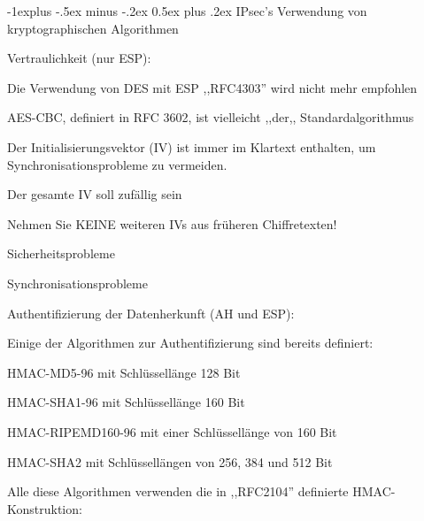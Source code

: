 \documentclass[a4paper]{article}
\makeatletter
\renewcommand{\subsection}{\@startsection{subsection}{2}{0mm}%
 {-1explus -.5ex minus -.2ex}%
 {0.5ex plus .2ex}%
 {\normalfont\normalsize\bfseries}}
\makeatother
\begin{document}
\begin{multicols}{3}
      \subsection{IPsec's Verwendung von kryptographischen Algorithmen}
      \begin{itemize*}
            \item Vertraulichkeit (nur ESP):
            \begin{itemize*}
                  \item Die Verwendung von DES mit ESP ,,RFC4303'' wird nicht mehr empfohlen
                  \item AES-CBC, definiert in RFC 3602, ist vielleicht ,,der,, Standardalgorithmus
                  \item Der Initialisierungsvektor (IV) ist immer im Klartext enthalten, um Synchronisationsprobleme zu vermeiden.
                  \item Der gesamte IV soll zufällig sein
                  \item Nehmen Sie KEINE weiteren IVs aus früheren Chiffretexten!
                  \begin{itemize*}
                        \item Sicherheitsprobleme
                        \item Synchronisationsprobleme
                  \end{itemize*}
            \end{itemize*}
            \item Authentifizierung der Datenherkunft (AH und ESP):
            \begin{itemize*}
                  \item Einige der Algorithmen zur Authentifizierung sind bereits definiert:
                  \begin{itemize*}
                        \item HMAC-MD5-96 mit Schlüssellänge 128 Bit
                        \item HMAC-SHA1-96 mit Schlüssellänge 160 Bit
                        \item HMAC-RIPEMD160-96 mit einer Schlüssellänge von 160 Bit
                        \item HMAC-SHA2 mit Schlüssellängen von 256, 384 und 512 Bit
                  \end{itemize*}
                  \item Alle diese Algorithmen verwenden die in ,,RFC2104'' definierte HMAC-Konstruktion:

\end{itemize*}
\end{itemize*}
\end{multicols}
\end{document}

